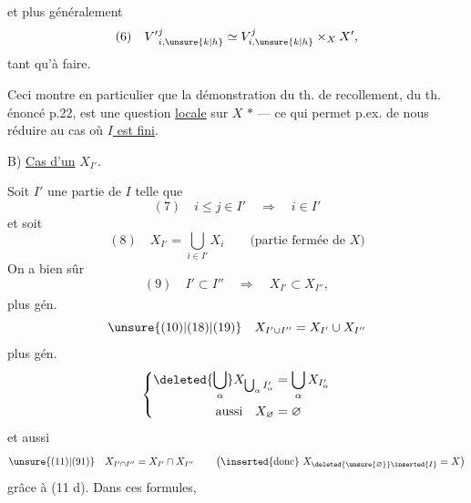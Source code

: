 et plus généralement
\[
(6)\quad V'{}^{j}_{i,\unsure{k|h}}\simeq V^{j}_{i,\unsure{k|h}}\times_X X',
\]
tant qu'à faire.

Ceci montre en particulier que la démonstration du th. de recollement, du th. énoncé p.22, est une question \uline{locale} sur $X$ \textcircled{$*$} --- ce qui permet p.ex. de nous réduire au cas où  \uline{$I$ est fini}.



B) \uline{Cas d'un} $X_{I'}$. 

Soit $I'$ une partie de $I$ telle que
\[
(7)\quad i\leq j\in I'\quad\Longrightarrow\quad i\in I'
\]
et soit
\[
(8)\quad X_{I'}=\bigcup_{i\in I'}X_i\qquad\text{(partie fermée de $X$)}
\]
On a bien sûr
\[
(9)\quad I'\subset I''\quad\Longrightarrow\quad X_{I'}\subset X_{I''},
\]
plus gén\textsuperscript{}.
\[
\unsure{(10)|(18)|(19)}\quad X_{I'\cup I''}=X_{I'}\cup X_{I''}
\]
plus gén.
\[
\left\{\begin{aligned}
\deleted{\bigcup_\alpha}X_{\bigcup_\alpha I'_\alpha}&=\bigcup_\alpha X_{I'_\alpha}\\
\text{aussi}\quad X_{\varnothing}&=\varnothing
\end{aligned}\right.
\]
 et aussi
\[
\unsure{(11)|(91)}\quad X_{I'\cap I''}=X_{I'}\cap X_{I''}\qquad
\left(\text{\inserted{donc} }X_{\deleted{\unsure{\varnothing}}\inserted{I}}=X\right)
\]
grâce à (11 d). Dans ces formules,

